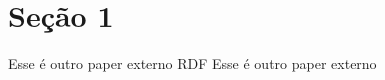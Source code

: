 \section{Seção 1}
Esse é outro paper externo
\gls{RDF}\cite{buildingsmartinternationalBIMCollaborationFormat2019}
Esse é outro paper externo

